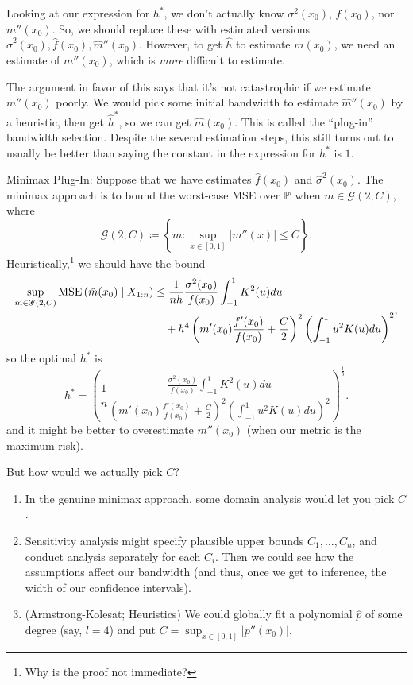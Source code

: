 Looking at our expression for $h^*$, we don't actually know $\sigma^2(x_0)$, $f(x_0)$, nor $m''(x_0)$. So, we should replace these with estimated versions $\hat{\sigma}^2(x_0), \hat{f}(x_0), \hat{m}''(x_0)$. However, to get $\hat{h}$ to estimate $m(x_0)$, we need an estimate of $m''(x_0)$, which is \emph{more} difficult to estimate.

The argument in favor of this says that it's not catastrophic if we estimate $m''(x_0)$ poorly. We would pick some initial bandwidth to estimate $\hat{m}''(x_0)$ by a heuristic, then get $\hat{h}^*$, so we can get $\hat{m}(x_0)$. This is called the ``plug-in'' bandwidth selection. Despite the several estimation steps, this still turns out to usually be better than saying the constant in the expression for $h^*$ is $1$.

Minimax Plug-In: 
Suppose that we have estimates $\hat{f}(x_0)$ and $\hat{\sigma}^2(x_0)$. The minimax approach is to bound the worst-case MSE over $\P$ when $m \in \mathscr{G}(2,C)$, where
\[
\mathscr{G}(2,C) \coloneqq \left\{m: \sup_{x\in[0,1]} \left| m''(x) \right| \le C\right\}
.\]
Heuristically,\footnote{Why is the proof not immediate?} we should have the bound
\[
	\begin{aligned}
		\sup_{m \in \mathscr{G}(2,C)} \MSE\left( \hat{m}(x_0) \mid X_{1:n} \right)
		&\le \frac{1}{nh} \frac{\sigma^2(x_0)}{f(x_0)} \int_{-1}^{1} K^2(u)du \\
		&\quad + h^4 \left( m'(x_0) \frac{f'(x_0)}{f(x_0)} + \frac{C}{2} \right)^2 \left( \int_{-1}^{1} u^2 K(u)du \right)^2
	\end{aligned}
,\]
so the optimal $h^*$ is
\[
	h^* = \left(
		\frac{1}{n}
		\frac{\frac{\sigma^2(x_0)}{f(x_0)} \int_{-1}^{1} K^2(u)du}{\left( m'(x_0) \frac{f'(x_0)}{f(x_0)} + \frac{C}{2} \right)^2 \left( \int_{-1}^{1} u^2K(u)du  \right)^2}
	\right)^{\frac{1}{5}}
.\]
and it might be better to overestimate $m''(x_0)$ (when our metric is the maximum risk).

But how would we actually pick $C$?

\begin{enumerate}[label=(\roman*)]
	\item In the genuine minimax approach, some domain analysis would let you pick $C$.
	\item Sensitivity analysis might specify plausible upper bounds $C_1,\ldots,C_n$, and conduct analysis separately for each $C_i$. Then we could see how the assumptions affect our bandwidth (and thus, once we get to inference, the width of our confidence intervals).
	\item (Armstrong-Kolesat; Heuristics) We could globally fit a polynomial $\hat{p}$ of some degree (say, $l=4$) and put $C = \sup_{x \in [0,1]} \left| p''(x_0) \right|$.
\end{enumerate}


